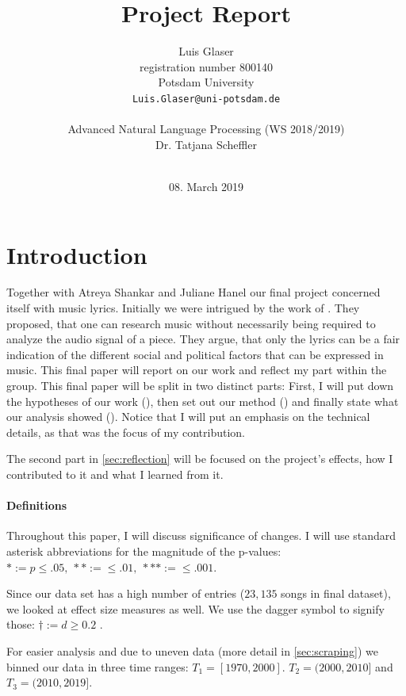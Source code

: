 \documentclass[11pt,a4paper]{article}
\title{Project Report}
\author{Luis Glaser\\
  registration number 800140 \\
  Potsdam University \\
  {\tt Luis.Glaser@uni-potsdam.de} \\
  \\
  Advanced Natural Language Processing (WS 2018/2019) \\
  Dr. Tatjana Scheffler \\
  \\}
\date{08. March 2019}
\begin{document}
\maketitle


\section{Introduction}\label{sec:introduction}
Together with Atreya Shankar and Juliane Hanel our final project concerned itself with music lyrics. Initially we were intrigued by the work of \citet{DBLP:conf/coling/FellS14}. They proposed, that one can research music without necessarily being required to analyze the audio signal of a piece. They argue, that only the lyrics can be a fair indication of the different social and political factors that can be expressed in music. This final paper will report on our work and reflect my part within the group.
This final paper will be split in two distinct parts: First, I will put down the hypotheses of our work (), then set out our method () and finally state what our analysis showed (). Notice that I will put an emphasis on the technical details, as that was the focus of my contribution.

The second part in \cref{sec:reflection} will be focused on the project's effects, how I contributed to it and what I learned from it. 
\paragraph{Definitions}\label{sec:definitions}

Throughout this paper, I will discuss significance of changes. I will use standard asterisk abbreviations for the magnitude of the p-values: $* := p \leq .05,\ ** := \leq .01,\ *** := \leq .001$.

Since our data set has a high number of entries ($23,135$ songs in final dataset), we looked at effect size measures as well.
We use the dagger symbol to signify those: $\dagger := d \geq 0.2$ \citep{Psychdict}.

For easier analysis and due to uneven data (more detail in \cref{sec:scraping}) we binned our data in three time ranges:
$T_1 = [1970,2000]$. $T_2 = (2000,2010]$ and $T_3 = (2010,2019]$.
\end{document}
